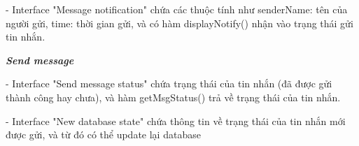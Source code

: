 \documentclass[a4paper]{article}
\begin{document}
\begin{itemize}
\begin{minipage}[b]{0.4\textwidth}
- Interface "Message notification" chứa các thuộc tính như senderName: tên của người gửi, time: thời gian gửi, và có hàm displayNotify() nhận vào trạng thái gửi tin nhắn.
\end{minipage}
\hfill
{}
\newline
\newline
\textbf{\textit{Send message}} \\
\begin{minipage}[b]{0.4\textwidth}
- Interface "Send message status" chứa trạng thái của tin nhắn (đã được gửi thành công hay chưa), và hàm getMsgStatus() trả về trạng thái của tin nhắn.
\end{minipage}
\hfill
{}
\begin{minipage}[b]{0.4\textwidth}
- Interface "New database state" chứa thông tin về trạng thái của tin nhắn mới được gửi, và từ đó có thể update lại database
\end{minipage}
\hfill
{}\\


\end{itemize}
\end{document}
